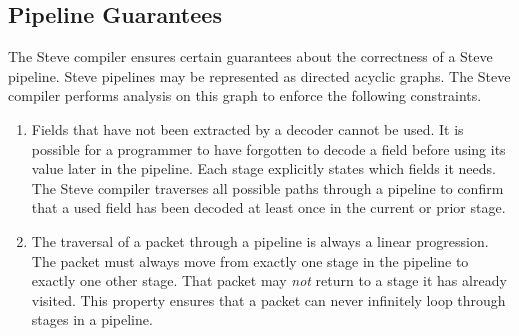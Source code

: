 %
%
%
%
%
%

\subsection{Pipeline Guarantees}

The Steve compiler ensures certain guarantees about the correctness of a Steve
pipeline. Steve pipelines may be represented as directed acyclic graphs. The
Steve compiler performs analysis on this graph to enforce the following
constraints.

\begin{enumerate}
\item Fields that have not been extracted by a decoder cannot be used. It is
possible for a programmer to have forgotten to decode a field before using its
value later in the pipeline. Each stage explicitly states which fields it needs.
The Steve compiler traverses all possible paths through a pipeline to confirm
that a used field has been decoded at least once in the current or prior stage.

\item The traversal of a packet through a pipeline is always a linear
progression. The packet must always move from exactly one stage in the pipeline
to exactly one other stage. That packet may \textit{not} return to a stage it
has already visited. This property ensures that a packet can never infinitely
loop through stages in a pipeline.
\end{enumerate}




